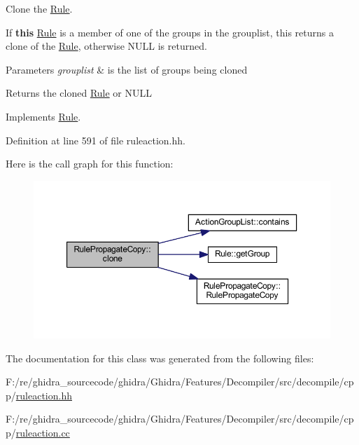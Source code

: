 Clone the \mbox{\hyperlink{class_rule}{Rule}}. 

If {\bfseries{this}} \mbox{\hyperlink{class_rule}{Rule}} is a member of one of the groups in the grouplist, this returns a clone of the \mbox{\hyperlink{class_rule}{Rule}}, otherwise N\+U\+LL is returned. 
\begin{DoxyParams}{Parameters}
{\em grouplist} & is the list of groups being cloned \\
\hline
\end{DoxyParams}
\begin{DoxyReturn}{Returns}
the cloned \mbox{\hyperlink{class_rule}{Rule}} or N\+U\+LL 
\end{DoxyReturn}


Implements \mbox{\hyperlink{class_rule_a70de90a76461bfa7ea0b575ce3c11e4d}{Rule}}.



Definition at line 591 of file ruleaction.\+hh.

Here is the call graph for this function\+:
\nopagebreak
\begin{figure}[H]
\begin{center}
\leavevmode
\includegraphics[width=350pt]{class_rule_propagate_copy_adcaeff563b266b1410a3a69038a8ba71_cgraph}
\end{center}
\end{figure}


The documentation for this class was generated from the following files\+:\begin{DoxyCompactItemize}
\item 
F\+:/re/ghidra\+\_\+sourcecode/ghidra/\+Ghidra/\+Features/\+Decompiler/src/decompile/cpp/\mbox{\hyperlink{ruleaction_8hh}{ruleaction.\+hh}}\item 
F\+:/re/ghidra\+\_\+sourcecode/ghidra/\+Ghidra/\+Features/\+Decompiler/src/decompile/cpp/\mbox{\hyperlink{ruleaction_8cc}{ruleaction.\+cc}}\end{DoxyCompactItemize}
